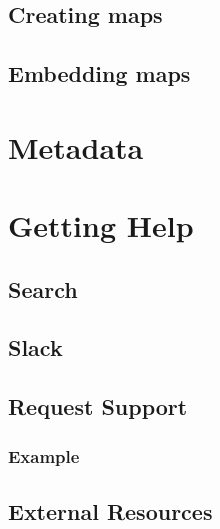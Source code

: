 \documentclass[
]{book}
\begin{document}
\hypertarget{creating-maps}{%
\section{Creating maps}\label{creating-maps}}

\hypertarget{embedding-maps}{%
\section{Embedding maps}\label{embedding-maps}}

\hypertarget{metadata}{%
\chapter{Metadata}\label{metadata}}

\hypertarget{getting-help}{%
\chapter{Getting Help}\label{getting-help}}

\hypertarget{search}{%
\section{Search}\label{search}}

\hypertarget{slack}{%
\section{Slack}\label{slack}}

\hypertarget{request-support}{%
\section{Request Support}\label{request-support}}

\hypertarget{example}{%
\subsection{Example}\label{example}}

\hypertarget{external-resources}{%
\section{External Resources}\label{external-resources}}

  
\end{document}

